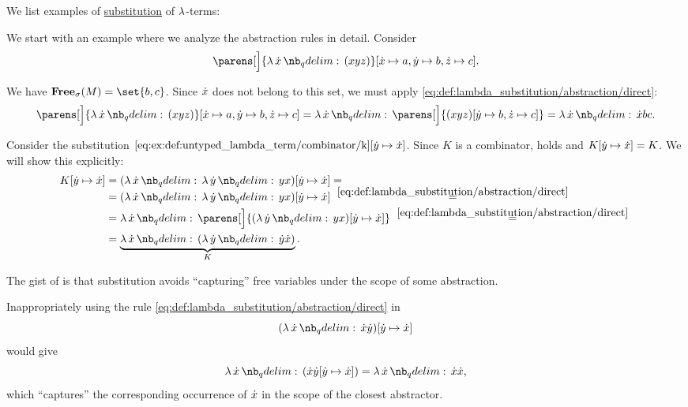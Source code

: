 \begin{example}\label{ex:def:lambda_substitution}
  We list examples of \hyperref[def:lambda_substitution]{substitution} of \( \mathrm{\lambda} \)-terms:
  \begin{thmenum}
     We start with an example where we analyze the abstraction rules in detail. Consider
    \begin{equation*}
      \parens[\Big]{ \qabs \synx (xyz) }[\synx \mapsto a, \syny \mapsto b, \synz \mapsto c].
    \end{equation*}

    We have \( \op*{Free}_\sigma(M) = \set{ b, c } \). Since \( {\dot{x}} \) does not belong to this set, we must apply \eqref{eq:def:lambda_substitution/abstraction/direct}:
    \begin{equation*}
      \parens[\Big]{ \qabs \synx (xyz) }[\synx \mapsto a, \syny \mapsto b, \synz \mapsto c]
      =
      \qabs \synx \parens[\Big]{ (xyz)[\syny \mapsto b, \synz \mapsto c] }
      =
      \qabs \synx \synx b c.
    \end{equation*}

     Consider the substitution \( \ref{eq:ex:def:untyped_lambda_term/combinator/k}[{\dot{y}} \mapsto {\dot{x}}] \). Since  \( K \) is a combinator,  holds and \( K[{\dot{y}} \mapsto {\dot{x}}] = K \). We will show this explicitly:
    \begin{align*}
      K[\syny \mapsto \synx]
      &=
      (\qabs \synx \qabs \syny yx)[\syny \mapsto \synx]
      = \\ &=
      (\qabs \synx \qabs \syny yx)[\syny \mapsto \synx]
      \reloset {\eqref{eq:def:lambda_substitution/abstraction/direct}} = \\ &=
      \qabs \synx \parens[\Big]{ (\qabs \syny yx)[\syny \mapsto \synx] }
      \reloset {\eqref{eq:def:lambda_substitution/abstraction/direct}} = \\ &=
      \underbrace{\qabs \synx (\qabs \syny \syny \synx)}_{K}.
    \end{align*}

     The gist of  is that substitution avoids \enquote{capturing} free variables under the scope of some abstraction.

    Inappropriately using the rule \eqref{eq:def:lambda_substitution/abstraction/direct} in
    \begin{equation*}
      (\qabs \synx \synx \syny)[\syny \mapsto \synx]
    \end{equation*}
    would give
    \begin{equation*}
      \qabs \synx (\synx \syny[\syny \mapsto \synx]) = \qabs \synx \synx \synx,
    \end{equation*}
    which \enquote{captures} the corresponding occurrence of \( {\dot{x}} \) in the scope of the closest abstractor.


\end{thmenum}
\end{example}
